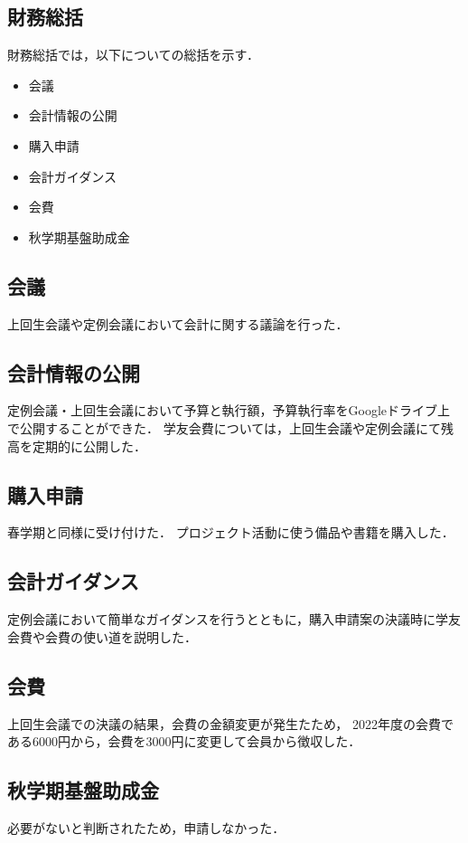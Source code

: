 \subsection*{財務総括}


財務総括では，以下についての総括を示す．
\begin{itemize}
  \item 会議
  \item 会計情報の公開
  \item 購入申請
  \item 会計ガイダンス
  \item 会費
  \item 秋学期基盤助成金
\end{itemize}

\subsection*{会議}
上回生会議や定例会議において会計に関する議論を行った．

\subsection*{会計情報の公開}
定例会議・上回生会議において予算と執行額，予算執行率をGoogleドライブ上で公開することができた．
学友会費については，上回生会議や定例会議にて残高を定期的に公開した．

\subsection*{購入申請}
春学期と同様に受け付けた．
プロジェクト活動に使う備品や書籍を購入した．

\subsection*{会計ガイダンス}
定例会議において簡単なガイダンスを行うとともに，購入申請案の決議時に学友会費や会費の使い道を説明した．

\subsection*{会費}
上回生会議での決議の結果，会費の金額変更が発生たため，
2022年度の会費である6000円から，会費を3000円に変更して会員から徴収した．

\subsection*{秋学期基盤助成金}
必要がないと判断されたため，申請しなかった．
